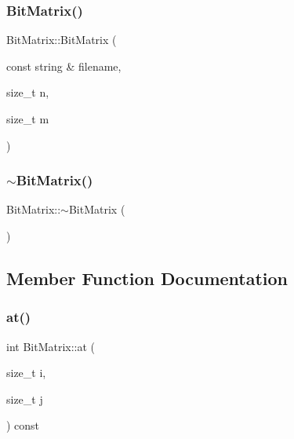 \mbox{\label{classBitMatrix_a47e8b65693dc2e86541d0098232654a7}} 
\subsubsection{\texorpdfstring{Bit\+Matrix()}{BitMatrix()}\hspace{0.1cm}{\footnotesize\ttfamily [2/2]}}
{\footnotesize\ttfamily Bit\+Matrix\+::\+Bit\+Matrix (\begin{DoxyParamCaption}\item[{const string \&}]{filename,  }\item[{size\+\_\+t}]{n,  }\item[{size\+\_\+t}]{m }\end{DoxyParamCaption})\hspace{0.3cm}{\ttfamily [inline]}}

\mbox{\label{classBitMatrix_aa264bc0bfe4a54ca8e0cafcd17aaddd1}} 
\subsubsection{\texorpdfstring{$\sim$\+Bit\+Matrix()}{~BitMatrix()}}
{\footnotesize\ttfamily Bit\+Matrix\+::$\sim$\+Bit\+Matrix (\begin{DoxyParamCaption}{ }\end{DoxyParamCaption})\hspace{0.3cm}{\ttfamily [inline]}}



\subsection{Member Function Documentation}
\mbox{\label{classBitMatrix_a4ec563a3bf6d62141d719ebeed5348e8}} 
\subsubsection{\texorpdfstring{at()}{at()}}
{\footnotesize\ttfamily int Bit\+Matrix\+::at (\begin{DoxyParamCaption}\item[{size\+\_\+t}]{i,  }\item[{size\+\_\+t}]{j }\end{DoxyParamCaption}) const\hspace{0.3cm}{\ttfamily [inline]}}

